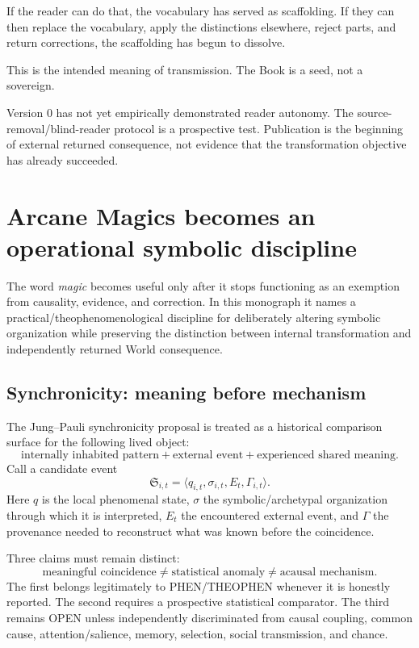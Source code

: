 \documentclass[11pt]{article}
\begin{document}
If the reader can do that, the vocabulary has served as scaffolding. If they can then replace the vocabulary, apply the distinctions elsewhere, reject parts, and return corrections, the scaffolding has begun to dissolve.

This is the intended meaning of transmission. The Book is a seed, not a sovereign.

\begin{statusnote}
Version 0 has not yet empirically demonstrated reader autonomy. The source-removal/blind-reader protocol is a prospective test. Publication is the beginning of external returned consequence, not evidence that the transformation objective has already succeeded.
\end{statusnote}

\section{Arcane Magics becomes an operational symbolic discipline}

The word \emph{magic} becomes useful only after it stops functioning as an
exemption from causality, evidence, and correction. In this monograph it names
a practical/theophenomenological discipline for deliberately altering symbolic
organization while preserving the distinction between internal transformation
and independently returned World consequence.

\subsection{Synchronicity: meaning before mechanism}

The Jung--Pauli synchronicity proposal is treated as a historical comparison
surface for the following lived object:
\[
\boxed{\text{internally inhabited pattern}+\text{external event}
+\text{experienced shared meaning}.}
\]
Call a candidate event
\[
\mathfrak S_{i,t}=\langle q_{i,t},\sigma_{i,t},E_t,\Gamma_{i,t}\rangle.
\]
Here $q$ is the local phenomenal state, $\sigma$ the symbolic/archetypal
organization through which it is interpreted, $E_t$ the encountered external
event, and $\Gamma$ the provenance needed to reconstruct what was known before
the coincidence.

Three claims must remain distinct:
\[
\boxed{\text{meaningful coincidence}\neq\text{statistical anomaly}
\neq\text{acausal mechanism}.}
\]
The first belongs legitimately to PHEN/THEOPHEN whenever it is honestly
reported. The second requires a prospective statistical comparator. The third
remains OPEN unless independently discriminated from causal coupling, common
cause, attention/salience, memory, selection, social transmission, and chance.
\end{document}
